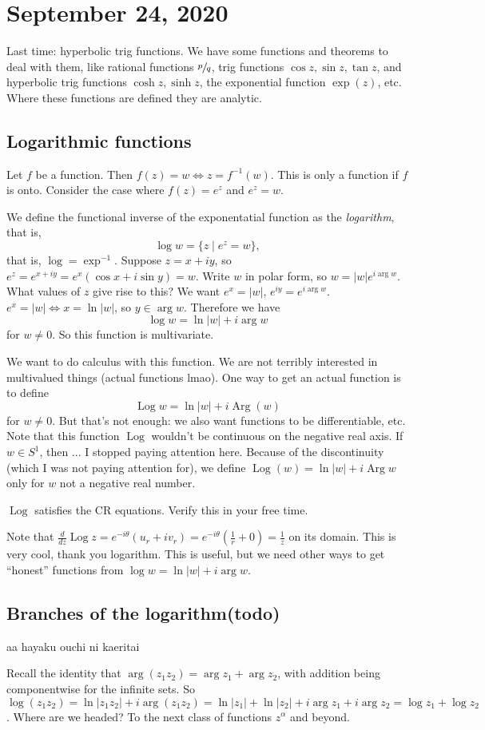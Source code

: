 \section{September 24, 2020}
Last time: hyperbolic trig functions. We have some functions and theorems to deal with them, like rational functions $\sfrac{p}{q}$, trig functions $\cos z, \sin z, \tan z$, and hyperbolic trig functions $\cosh z, \sinh z$, the exponential function $\exp(z)$, etc. Where these functions are defined they are analytic.
\subsection{Logarithmic functions}
Let $f$ be a function. Then $f(z)=w \iff z=f^{-1}(w)$. This is only a function if $f$ is onto. Consider the case where $f(z)=e^{z}$ and $e^{z}=w$. 
\begin{definition}[Logarithm]
    We define the functional inverse of the exponentatial function as the \emph{logarithm}, that is, \[
    \log w = \{z \mid e^z=w\},
    \] that is, $\log=\exp^{-1}$.
Suppose $z=x+iy$, so $e^z=e^{x+iy}=e^{x}(\cos x +i\sin y)=w$. Write $w$ in polar form, so $w=|w|e^{i\operatorname{arg}w}$. What values of $z$ give rise to this? We want $e^{x}=|w|$, $e^{iy}=e^{i\operatorname{arg}w}$. $e^{x}=|w|\iff x=\ln|w|$, so $y\in \operatorname{arg}w$. Therefore we have \[
    \log w=\ln|w|+i\operatorname{arg}w
\] for $w\neq 0$. So this function is multivariate.
\end{definition}
We want to do calculus with this function. We are not terribly interested in multivalued things (actual functions lmao). One way to get an actual function is to define \[
    \operatorname{Log}w=\ln|w|+i\operatorname{Arg}(w)
\] for $w\neq 0$. But that's not enough: we also want functions to be differentiable, etc. Note that this function $\operatorname{Log}$ wouldn't be continuous on the negative real axis. If $w\in S^{1} $, then ... I stopped paying attention here. Because of the discontinuity (which I was not paying attention for), we define $\operatorname{Log}(w)=\ln|w|+i\operatorname{Arg}w$ only for $w$ not a negative real number. 

\begin{claim}
    $\operatorname{Log}$ satisfies the CR equations. Verify this in your free time.
\end{claim}
Note that $\frac{d}{dz}\operatorname{Log}z=e^{-i\theta}(u_r+iv_r)=e^{-i\theta}(\frac{1}{r}+0)=\frac{1}{z}$ on its domain. This is very cool, thank you logarithm. This is useful, but we need other ways to get ``honest'' functions from $\log w=\ln|w|+i\operatorname{arg}w$.
\subsection{Branches of the logarithm(todo)}
aa hayaku ouchi ni kaeritai

Recall the identity that $\operatorname{arg}(z_1z_2)=\operatorname{arg}z_1+\operatorname{arg}z_2$, with addition being componentwise for the infinite sets. So $\log (z_1z_2)=\ln |z_1z_2|+i\operatorname{arg}(z_1z_2)=\ln|z_1|+\ln|z_2|+i\operatorname{arg}z_1+i\operatorname{arg}z_2=\log z_1+\log z_2$. 
\orbreak
Where are we headed? To the next class of functions $z^{\alpha }$ and beyond.

